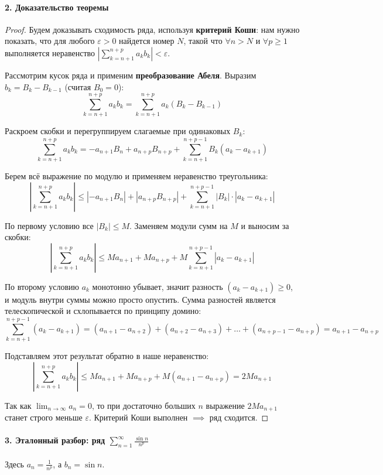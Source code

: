 \paragraph{2. Доказательство теоремы}
\begin{proof}
Будем доказывать сходимость ряда, используя \textbf{критерий Коши}: нам нужно показать, что для любого $\varepsilon > 0$ найдется номер $N$, такой что $\forall n > N$ и $\forall p \ge 1$ выполняется неравенство $\left| \sum_{k=n+1}^{n+p} a_k b_k \right| < \varepsilon$.

Рассмотрим кусок ряда и применим \textbf{преобразование Абеля}. Выразим $b_k = B_k - B_{k-1}$ (считая $B_0 = 0$):
$$ \sum_{k=n+1}^{n+p} a_k b_k = \sum_{k=n+1}^{n+p} a_k (B_k - B_{k-1}) $$

Раскроем скобки и перегруппируем слагаемые при одинаковых $B_k$:
$$ \sum_{k=n+1}^{n+p} a_k b_k = -a_{n+1} B_n + a_{n+p} B_{n+p} + \sum_{k=n+1}^{n+p-1} B_k (a_k - a_{k+1}) $$

Берем всё выражение по модулю и применяем неравенство треугольника:
$$ \left| \sum_{k=n+1}^{n+p} a_k b_k \right| \le |-a_{n+1} B_n| + |a_{n+p} B_{n+p}| + \sum_{k=n+1}^{n+p-1} |B_k| \cdot |a_k - a_{k+1}| $$

По первому условию все $|B_k| \le M$. Заменяем модули сумм на $M$ и выносим за скобки:
$$ \left| \sum_{k=n+1}^{n+p} a_k b_k \right| \le M a_{n+1} + M a_{n+p} + M \sum_{k=n+1}^{n+p-1} |a_k - a_{k+1}| $$

По второму условию $a_k$ монотонно убывает, значит разность $(a_k - a_{k+1}) \ge 0$, и модуль внутри суммы можно просто опустить. Сумма разностей является телескопической и схлопывается по принципу домино:
$$ \sum_{k=n+1}^{n+p-1} (a_k - a_{k+1}) = (a_{n+1} - a_{n+2}) + (a_{n+2} - a_{n+3}) + \dots + (a_{n+p-1} - a_{n+p}) = a_{n+1} - a_{n+p} $$

Подставляем этот результат обратно в наше неравенство:
$$ \left| \sum_{k=n+1}^{n+p} a_k b_k \right| \le M a_{n+1} + M a_{n+p} + M (a_{n+1} - a_{n+p}) = 2M a_{n+1} $$

Так как $\lim_{n \to \infty} a_n = 0$, то при достаточно больших $n$ выражение $2M a_{n+1}$ станет строго меньше $\varepsilon$. Критерий Коши выполнен $\implies$ ряд сходится.
\end{proof}

\paragraph{3. Эталонный разбор: ряд $\sum_{n=1}^{\infty} \frac{\sin n}{n^p}$}
Здесь $a_n = \frac{1}{n^p}$, а $b_n = \sin n$.

